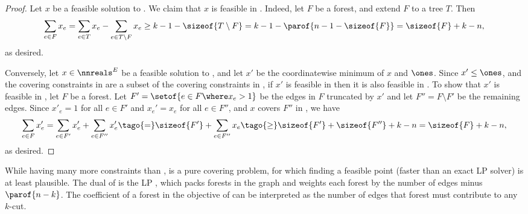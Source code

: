 \documentclass[11pt]{article}
\numberwithin{equation}{section}
\theoremstyle{definition}
\theoremstyle{plain}
\begin{document}
\begin{proof}
  Let $x$ be a feasible solution to . We claim that
  $x$ is feasible in . Indeed, let $F$ be a forest,
  and extend $F$ to a tree $T$. Then
  \begin{align*}
    \sum_{e \in F} x_e %
    = %
    \sum_{e \in T} x_e - \sum_{e \in T \setminus F} x_e %
    \geq                                                %
    k - 1 - \sizeof{T \setminus F}                      %
    =                                                   %
    k - 1 - \parof{n-1 - \sizeof{F}}                    %
    =                                                   %
    \sizeof{F} + k - n,
  \end{align*}
  as desired.

  Conversely, let $x \in \nnreals^E$ be a feasible solution to
  , and let $x'$ be the coordinatewise minimum of $x$
  and $\ones$. Since $x' \leq \ones$, and the covering constraints in
   are a subset of the covering constraints in
  , if $x'$ is feasible in  then it is
  also feasible in . To show that $x'$ is feasible in
  , let $F$ be a forest. Let
  $F' = \setof{e \in F \where x_e > 1}$ be the edges in $F$ truncated
  by $x'$ and let $F'' = F \setminus F'$ be the remaining edges. Since
  \tagr $x'_e = 1$ for all $e \in F'$ and $x_e' = x_e$ for all
  $e \in F''$, and \tagr $x$ covers $F''$ in , we have
  \begin{align*}
    \sum_{e \in F} x_e'          %
    =                           %
    \sum_{e \in F'} x_e' + \sum_{e \in F''} x'_e %
    \tago{=}
    \sizeof{F'} + \sum_{e \in F''} x_e %
    \tago{\geq}                                  %
    \sizeof{F'} + \sizeof{F''} + k - n    %
    =                                     %
    \sizeof{F} + k - n,
  \end{align*}
  as desired.
\end{proof}

While having many more constraints than ,
 is a pure covering problem, for which finding a
feasible point (faster than an exact LP solver) is at least
plausible. The dual of  is the LP
, which packs forests in the graph and
weights each forest by the number of edges minus $\parof{n - k}$. The
coefficient of a forest in the objective of
 can be interpreted as the number of
edges that forest must contribute to any $k$-cut.
\end{document}
